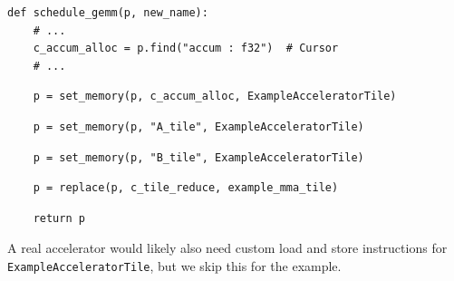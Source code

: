 \begin{minipage}[t]{0.5\textwidth}
{\begin{verbatim}
def schedule_gemm(p, new_name):
    # ...
    c_accum_alloc = p.find("accum : f32")  # Cursor
    # ...
\end{verbatim}
\begin{mdframed}[style=MyFrame, backgroundcolor=violetBoxBg]
\color{violetBoxFg}
\begin{verbatim}
    p = set_memory(p, c_accum_alloc, ExampleAcceleratorTile)
\end{verbatim}
\end{mdframed}
\begin{mdframed}[style=MyFrame, backgroundcolor=yellowBoxBg]
\color{yellowBoxFg}
\begin{verbatim}
    p = set_memory(p, "A_tile", ExampleAcceleratorTile)
\end{verbatim}
\end{mdframed}
\begin{mdframed}[style=MyFrame, backgroundcolor=greenBoxBg]
\color{greenBoxFg}
\begin{verbatim}
    p = set_memory(p, "B_tile", ExampleAcceleratorTile)
\end{verbatim}
\end{mdframed}
\begin{mdframed}[style=MyFrame, backgroundcolor=blueBoxBg]
\color{blueBoxFg}
\begin{verbatim}
    p = replace(p, c_tile_reduce, example_mma_tile)
\end{verbatim}
\end{mdframed}
\begin{verbatim}
    return p
\end{verbatim}
}
\vspace{6mm}
A real accelerator would likely also need custom load and store instructions for \texttt{ExampleAcceleratorTile}, but we skip this for the example.
\end{minipage}
\newpage
{}


